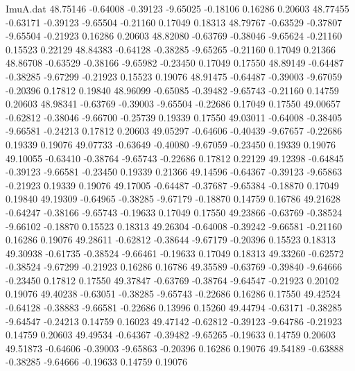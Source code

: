 \begin{filecontents}{ImuA.dat}
  48.75146   -0.64008   -0.39123   -9.65025   -0.18106    0.16286    0.20603
  48.77455   -0.63171   -0.39123   -9.65504   -0.21160    0.17049    0.18313
  48.79767   -0.63529   -0.37807   -9.65504   -0.21923    0.16286    0.20603
  48.82080   -0.63769   -0.38046   -9.65624   -0.21160    0.15523    0.22129
  48.84383   -0.64128   -0.38285   -9.65265   -0.21160    0.17049    0.21366
  48.86708   -0.63529   -0.38166   -9.65982   -0.23450    0.17049    0.17550
  48.89149   -0.64487   -0.38285   -9.67299   -0.21923    0.15523    0.19076
  48.91475   -0.64487   -0.39003   -9.67059   -0.20396    0.17812    0.19840
  48.96099   -0.65085   -0.39482   -9.65743   -0.21160    0.14759    0.20603
  48.98341   -0.63769   -0.39003   -9.65504   -0.22686    0.17049    0.17550
  49.00657   -0.62812   -0.38046   -9.66700   -0.25739    0.19339    0.17550
  49.03011   -0.64008   -0.38405   -9.66581   -0.24213    0.17812    0.20603
  49.05297   -0.64606   -0.40439   -9.67657   -0.22686    0.19339    0.19076
  49.07733   -0.63649   -0.40080   -9.67059   -0.23450    0.19339    0.19076
  49.10055   -0.63410   -0.38764   -9.65743   -0.22686    0.17812    0.22129
  49.12398   -0.64845   -0.39123   -9.66581   -0.23450    0.19339    0.21366
  49.14596   -0.64367   -0.39123   -9.65863   -0.21923    0.19339    0.19076
  49.17005   -0.64487   -0.37687   -9.65384   -0.18870    0.17049    0.19840
  49.19309   -0.64965   -0.38285   -9.67179   -0.18870    0.14759    0.16786
  49.21628   -0.64247   -0.38166   -9.65743   -0.19633    0.17049    0.17550
  49.23866   -0.63769   -0.38524   -9.66102   -0.18870    0.15523    0.18313
  49.26304   -0.64008   -0.39242   -9.66581   -0.21160    0.16286    0.19076
  49.28611   -0.62812   -0.38644   -9.67179   -0.20396    0.15523    0.18313
  49.30938   -0.61735   -0.38524   -9.66461   -0.19633    0.17049    0.18313
  49.33260   -0.62572   -0.38524   -9.67299   -0.21923    0.16286    0.16786
  49.35589   -0.63769   -0.39840   -9.64666   -0.23450    0.17812    0.17550
  49.37847   -0.63769   -0.38764   -9.64547   -0.21923    0.20102    0.19076
  49.40238   -0.63051   -0.38285   -9.65743   -0.22686    0.16286    0.17550
  49.42524   -0.64128   -0.38883   -9.66581   -0.22686    0.13996    0.15260
  49.44794   -0.63171   -0.38285   -9.64547   -0.24213    0.14759    0.16023
  49.47142   -0.62812   -0.39123   -9.64786   -0.21923    0.14759    0.20603
  49.49534   -0.64367   -0.39482   -9.65265   -0.19633    0.14759    0.20603
  49.51873   -0.64606   -0.39003   -9.65863   -0.20396    0.16286    0.19076
  49.54189   -0.63888   -0.38285   -9.64666   -0.19633    0.14759    0.19076

\end{filecontents}
